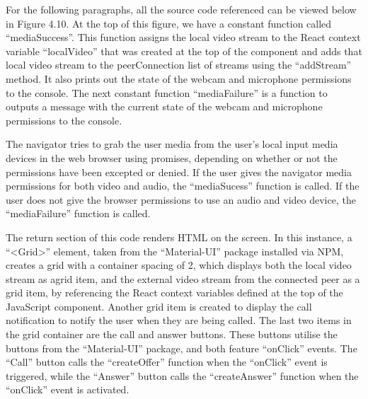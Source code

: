 For the following paragraphs, all the source code referenced can be viewed below in Figure 4.10. At the top of this figure, we have a constant function called “mediaSuccess”. This function assigns the local video stream to the React context variable “localVideo” that was created at the top of the component and adds that local video stream to the peerConnection list of streams using the “addStream” method. It also prints out the state of the webcam and microphone permissions to the console. The next constant function “mediaFailure” is a function to outputs a message with the current state of the webcam and microphone permissions to the console.

The navigator tries to grab the user media from the user’s local input media devices in the web browser using promises, depending on whether or not the permissions have been excepted or denied. If the user gives the navigator media permissions for both video and audio, the “mediaSucess” function is called. If the user does not give the browser permissions to use an audio and video device, the “mediaFailure” function is called.

The return section of this code renders HTML on the screen. In this instance, a “<Grid>” element, taken from the “Material-UI” package installed via NPM, creates a grid with a container spacing of  2, which displays both the local video stream as agrid item, and the external video stream from the connected peer as a grid item, by referencing the React context variables defined at the top of the JavaScript component. Another grid item is created to display the call notification to notify the user when they are being called. The last two items in the grid container are the call and answer buttons. These buttons utilise the buttons from the “Material-UI” package, and both feature “onClick” events. The “Call” button calls the “createOffer” function when the “onClick” event is triggered, while the “Answer” button calls the “createAnswer” function when the “onClick” event is activated.

